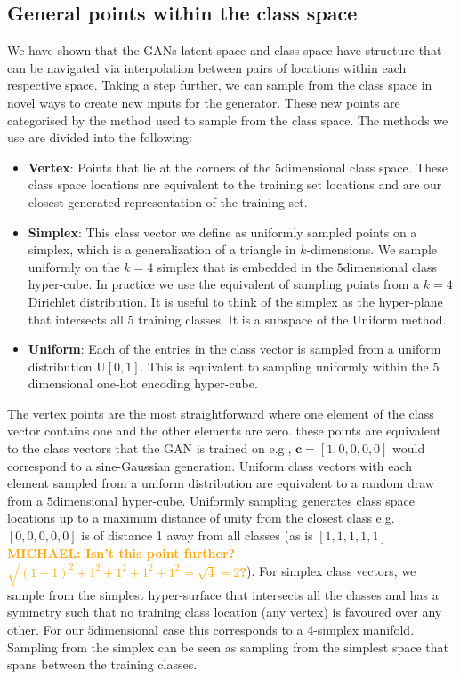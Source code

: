 \documentclass[12pt]{iopart}
\newcommand{\michael}[1]{\textbf{\textcolor{orange}{MICHAEL: #1}}}
\newcommand{\ndimensional}[1]{$#1$\nobreakdash\discretionary{-}{-}{-}dimensional}
\begin{document}
\subsection{General points within the class space}
We have shown that the \acp{GAN} latent space and class space have structure that can be navigated via interpolation between pairs of locations within each respective space. Taking a step further, we can sample from the class space in novel ways to create new inputs for the generator. These new points are categorised by the method used to sample from the class space. The methods we use are divided into the following: 
%
\begin{itemize}
%
\item {\bf Vertex}: Points that lie at the corners of the \ndimensional{5} class space. These class space locations are equivalent to the training set locations and are our closest generated representation of the training set.
%
\item {\bf Simplex}: This class vector we define as uniformly sampled points on a simplex, which is a generalization of a triangle in $k$-dimensions. We sample uniformly on the $k=4$ simplex that is embedded in the \ndimensional{5} class hyper-cube. In practice we use the equivalent of sampling points from a $k=4$ Dirichlet distribution. It is useful to think of the simplex as the hyper-plane that intersects all 5 training classes. It is a subspace of the Uniform method.  
%
\item {\bf Uniform}: Each of the entries in the class vector is sampled from a uniform distribution $\text{U}[0,1]$. This is equivalent to sampling uniformly within the \ndimensional{5} one-hot encoding hyper-cube.
%
\end{itemize}

The vertex points are the most straightforward where one element of the class vector contains one and the other elements are zero. these points are equivalent to the class vectors that the \ac{GAN} is trained on e.g., $\mathbf{c} = [1,0,0,0,0]$ would correspond to a sine-Gaussian generation. Uniform class vectors with each element sampled from a uniform distribution are equivalent to a random draw from a \ndimensional{5} hyper-cube. Uniformly sampling generates class space locations up to a maximum distance of unity from the closest class e.g. $[0,0,0,0,0]$ is of distance 1 away from all classes (as is $[1,1,1,1,1]$ \michael{Isn't this point further? $\sqrt{(1-1)^2 + 1^2 + 1^2 + 1^2 + 1^2} = \sqrt{4} = 2$?}). For simplex class vectors, we sample from the simplest hyper-surface that intersects all the classes and has a symmetry such that no training class location (any vertex) is favoured over any other. For our \ndimensional{5} case this corresponds to a 4-simplex manifold. Sampling from the simplex can be seen as sampling from the simplest space that spans between the training classes.   
\end{document}
